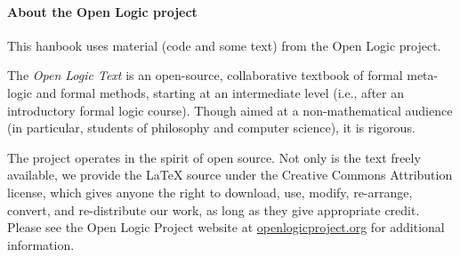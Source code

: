 \documentclass[../../../include/open-logic-chapter]{subfiles}
\begin{document}



\paragraph{About the Open Logic project}

This hanbook uses material (code and some text) from the Open Logic project. 

The \textit{Open Logic Text} is an open-source, collaborative textbook
of formal meta-logic and formal methods, starting at an intermediate level
(i.e., after an introductory formal logic course). Though aimed at a
non-mathematical audience (in particular, students of philosophy and
computer science), it is rigorous.

The project operates in the spirit of open source. Not only is the
text freely available, we provide the LaTeX source under the
Creative Commons Attribution license, which gives anyone the right to
download, use, modify, re-arrange, convert, and re-distribute our
work, as long as they give appropriate credit.
Please see the Open Logic Project website at
\href{http://openlogicproject.org/}{openlogicproject.org} for
additional information.
\end{document}
